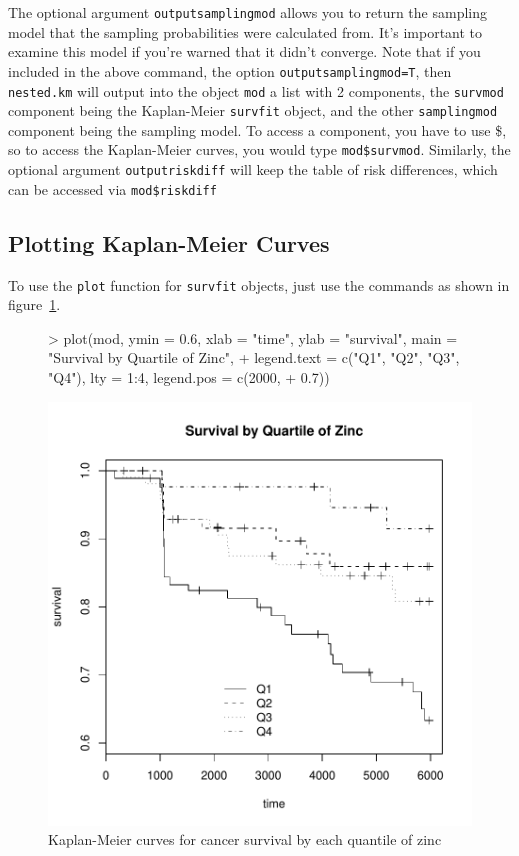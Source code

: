 \documentclass[10pt]{article}
\begin{document}
The optional argument \texttt{outputsamplingmod} allows you to return the sampling model
that the sampling probabilities were calculated from.  It's important to examine this
model if you're warned that it didn't converge.  Note that if you included in the above
command, the option \texttt{outputsamplingmod=T}, then \texttt{nested.km} will output
into the object \texttt{mod} a list with 2 components, the \texttt{survmod} component
being the Kaplan-Meier \texttt{survfit} object, and the other \texttt{samplingmod}
component being the sampling model. To access a component, you have to use \$, so to
access the Kaplan-Meier curves, you would type \texttt{mod\$survmod}.  Similarly, the
optional argument \texttt{outputriskdiff} will keep the table of risk differences, which
can be accessed via \texttt{mod\$riskdiff}


\subsection{Plotting Kaplan-Meier Curves}
\label{sec:plott-kapl-meier}

To use the \texttt{plot} function for \texttt{survfit} objects, just use the commands as
shown in figure~\ref{fig:PlotKM}.

\begin{figure}
  \centering
\begin{Schunk}
\begin{Sinput}
> plot(mod, ymin = 0.6, xlab = "time", ylab = "survival", main = "Survival by Quartile of Zinc", 
+     legend.text = c("Q1", "Q2", "Q3", "Q4"), lty = 1:4, legend.pos = c(2000, 
+         0.7))
\end{Sinput}
\end{Schunk}
\includegraphics{NestedCohort-PlotKM}

\caption{Kaplan-Meier curves for cancer survival by each quantile of zinc}
\label{fig:PlotKM}
\end{figure}
\end{document}
